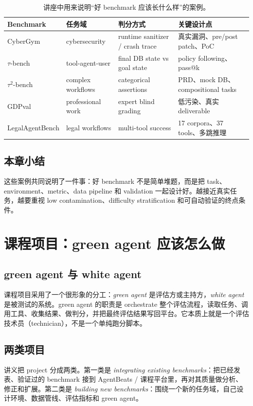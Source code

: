\documentclass[a4paper]{article}
\begin{document}
\begin{table}[H]
\centering
\small
\begin{tabular}{@{}p{}p{}p{}p{}@{}}
\toprule
Benchmark & 任务域 & 判分方式 & 关键设计点 \\
\midrule
CyberGym & cybersecurity & runtime sanitizer / crash trace & 真实漏洞、pre/post patch、PoC \\
\(\tau\)-bench & tool-agent-user & final DB state vs goal state & policy following、pass@k \\
\(\tau^2\)-bench & complex workflows & categorical assertions & PRD、mock DB、compositional tasks \\
GDPval & professional work & expert blind grading & 低污染、真实 deliverable \\
LegalAgentBench & legal workflows & multi-tool success & 17 corpora、37 tools、多跳推理 \\
\bottomrule
\end{tabular}
\caption{讲座中用来说明“好 benchmark 应该长什么样”的案例。}
\end{table}

\subsection{本章小结}
这些案例共同说明了一件事：好 benchmark 不是简单堆题，而是把 task、environment、metric、data pipeline 和 validation 一起设计好。越接近真实任务，越要重视 low contamination、difficulty stratification 和可自动验证的终点条件。

\section{课程项目：green agent 应该怎么做}
\subsection{green agent 与 white agent}
课程项目采用了一个很形象的分工：\emph{green agent} 是评估方或主持方，\emph{white agent} 是被测试的系统。green agent 的职责是 orchestrate 整个评估流程，读取任务、调用工具、收集结果、做判分，并把最终评估结果写回平台。它本质上就是一个评估技术员（technician），不是一个单纯跑分脚本。

\subsection{两类项目}
讲义把 project 分成两类。第一类是 \emph{integrating existing benchmarks}：把已经发表、验证过的 benchmark 接到 AgentBeats / 课程平台里，再对其质量做分析、修正和扩展。第二类是 \emph{building new benchmarks}：围绕一个新的任务域，自己设计环境、数据管线、评估指标和 green agent。
\end{document}
